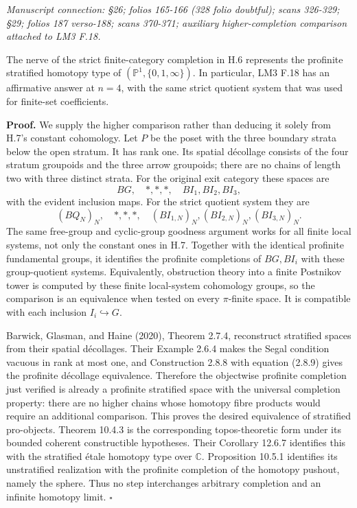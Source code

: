 \documentclass[10pt,a4paper]{article}
\begin{document}
\emph{Manuscript connection: \S{}26; folios 165-166 (328 folio doubtful); scans 326-329; \S{}29; folios 187 verso-188; scans 370-371; auxiliary higher-completion comparison attached to LM3 F.18.}

\nopagebreak[4]

The nerve of the strict finite-category completion in H.6 represents the profinite stratified homotopy type of \((\mathbb P^1,\{0,1,\infty\})\). In particular, LM3 F.18 has an affirmative answer at \(n=4\), with the same strict quotient system that was used for finite-set coefficients.

\textbf{Proof.} We supply the higher comparison rather than deducing it solely from H.7's constant cohomology. Let \(P\) be the poset with the three boundary strata below the open stratum. It has rank one. Its spatial d\'{e}collage consists of the four stratum groupoids and the three arrow groupoids; there are no chains of length two with three distinct strata. For the original exit category these spaces are \[
BG,\quad *,*,*,\quad BI_1,BI_2,BI_3,
\] with the evident inclusion maps. For the strict quotient system they are \[
(BQ_N)_N,\quad *,*,*,\quad(BI_{1,N})_N,(BI_{2,N})_N,(BI_{3,N})_N.
\] The same free-group and cyclic-group goodness argument works for all finite local systems, not only the constant ones in H.7. Together with the identical profinite fundamental groups, it identifies the profinite completions of \(BG,BI_i\) with these group-quotient systems. Equivalently, obstruction theory into a finite Postnikov tower is computed by these finite local-system cohomology groups, so the comparison is an equivalence when tested on every \(\pi\)-finite space. It is compatible with each inclusion \(I_i\hookrightarrow G\).

Barwick, Glasman, and Haine (2020), Theorem 2.7.4, reconstruct stratified spaces from their spatial d\'{e}collages. Their Example 2.6.4 makes the Segal condition vacuous in rank at most one, and Construction 2.8.8 with equation (2.8.9) gives the profinite d\'{e}collage equivalence. Therefore the objectwise profinite completion just verified is already a profinite stratified space with the universal completion property: there are no higher chains whose homotopy fibre products would require an additional comparison. This proves the desired equivalence of stratified pro-objects. Theorem 10.4.3 is the corresponding topos-theoretic form under its bounded coherent constructible hypotheses. Their Corollary 12.6.7 identifies this with the stratified \'{e}tale homotopy type over \(\mathbb C\). Proposition 10.5.1 identifies its unstratified realization with the profinite completion of the homotopy pushout, namely the sphere. Thus no step interchanges arbitrary completion and an infinite homotopy limit. \(\square\)
\end{document}
